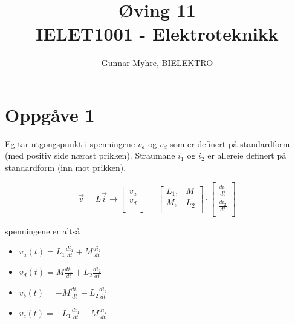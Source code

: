 \documentclass[12pt,a4paper]{article}
\title{%
  Øving 11 \\
  \large IELET1001 - Elektroteknikk \\
  }
\author{Gunnar Myhre, BIELEKTRO}
\begin{document}
  \maketitle

  \section*{Oppgåve 1}
    Eg tar utgongspunkt i spenningene $v_a$ og $v_d$ som er definert på
    standardform (med positiv side nærast prikken). Straumane $i_1$ og $i_2$ er
    allereie definert på standardform (inn mot prikken).

    \begin{equation}
      \vec{v} = L\vec{i} \rightarrow
      \left[ \begin{array}{c}
        v_a \\
        v_d \\
      \end{array} \right]
      =
      \left[ \begin{array}{cc}
        L_1, & M \\
        M, & L_2 \\
      \end{array} \right]
      \cdot
      \left[ \begin{array}{c}
        \frac{di_1}{dt} \\
        \frac{di_2}{dt} \\
      \end{array} \right]
    \end{equation}

    spenningene er altså
    \begin{itemize}
      \item $v_a(t) = L_1\frac{di_1}{dt} + M\frac{di_2}{dt}$
      \item $v_d(t) = M\frac{di_1}{dt} + L_2\frac{di_2}{dt}$
      \item $v_b(t) = -M\frac{di_1}{dt} - L_2\frac{di_2}{dt}$
      \item $v_c(t) = -L_1\frac{di_1}{dt} - M\frac{di_2}{dt}$
    \end{itemize}
\end{document}
